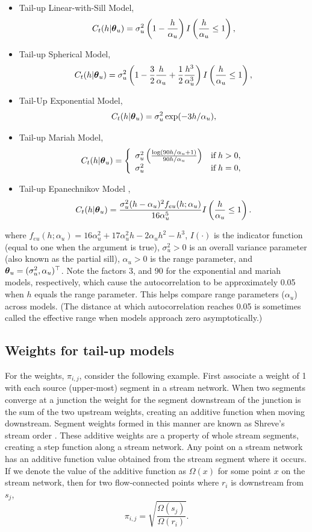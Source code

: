 \documentclass[nojss]{jss}
\def\btheta{\mbox{\boldmath $\theta$}}
\begin{document}
\begin{itemize}
\item Tail-up Linear-with-Sill Model,
  \[
  C_t(h|\btheta_u)=
  \sigma^2_u\left(1 -\frac{h}{\alpha_u}\right)I\left(\frac{h}{\alpha_u}\leq 1\right),
  \]
\item Tail-up Spherical Model,
  \[
  C_t(h|\btheta_u)=
  \sigma^2_u\left(1-\frac{3}{2}\frac{h}{\alpha_u}+\frac{1}{2}\frac{h^3}{\alpha_u^3}\right)
  I\left(\frac{h}{\alpha_u}\leq 1\right),
  \]
\item Tail-Up Exponential Model,
  \[
  C_t(h|\btheta_u)= \sigma^2_u\exp(-3h/\alpha_u),
  \]
\item Tail-up Mariah Model,
  \[
  C_t(h|\btheta_u)= \left\{ \begin{array}{ll}
      \sigma^2_u\left(\frac{\log(90h/\alpha_u+1)}{90h/\alpha_u}\right) &
      \textrm{if} \; h > 0,\\
      \sigma^2_u &
      \textrm{if} \; h = 0,\\
    \end{array} \right.
  \]
\item Tail-up Epanechnikov Model \citep{Garr:Mone:Ver:spat:2009},
  \[
  C_t(h|\btheta_u)=
      \frac{\sigma^2_u(h-\alpha_u)^2f_{eu}(h;\alpha_u)}{16\alpha_u^5} 
	I\left(\frac{h}{\alpha_u}\leq 1\right).
	\]
\end{itemize}
where $f_{eu}(h;\alpha_u)=16\alpha_u^2 + 17\alpha_u^2h - 2\alpha_uh^2-h^3$, $I(\cdot)$ is the indicator function (equal to one when the
argument is true), $\sigma^2_u > 0$ is an overall variance parameter
(also known as the partial sill), $\alpha_u > 0$ is the range
parameter, and $\btheta_u = (\sigma^2_u,\alpha_u)^\top$. Note the
factors 3, and 90 for the exponential and mariah models, respectively,
which cause the autocorrelation to be approximately 0.05 when $h$
equals the range parameter.  This helps compare range parameters
($\alpha_u$) across models. (The distance at which autocorrelation
reaches 0.05 is sometimes called the effective range when models
approach zero asymptotically.)

\subsection{Weights for tail-up models}\label{tailupWeights}

For the weights, $\pi_{i,j}$, consider the following example.  First
associate a weight of 1 with each source (upper-most) segment in a
stream network. When two segments converge at a junction the weight
for the segment downstream of the junction is the sum of the two
upstream weights, creating an additive function when moving
downstream. Segment weights formed in this manner are known as
Shreve's stream order \citep{Shre:infi:1967}. These additive weights
are a property of whole stream segments, creating a step function
along a stream network. Any point on a stream network has an additive
function value obtained from the stream segment where it occurs. If we
denote the value of the additive function as $\Omega(x)$ for some
point $x$ on the stream network, then for two flow-connected points
where $r_i$ is downstream from $s_j$,
\[ \pi_{i,j}=\sqrt{\frac{\Omega(s_j)}{\Omega(r_i)}}.  \]
\end{document}
